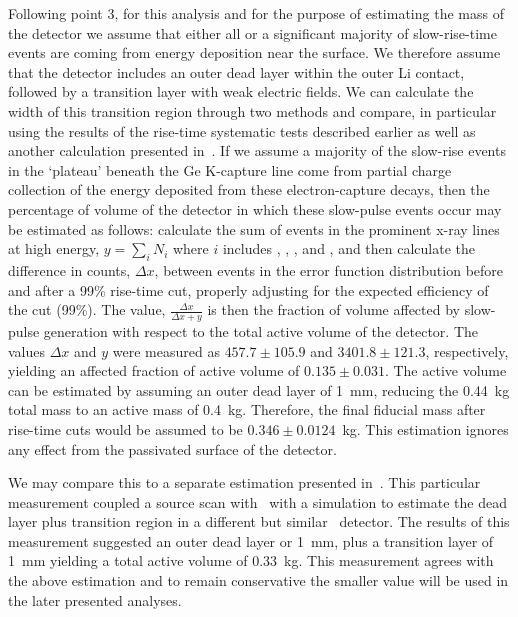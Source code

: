 	Following point 3, for this analysis and for the purpose of estimating the mass of the detector we assume that either all or a significant majority of slow-rise-time events are coming from energy deposition near the surface.  We therefore assume that the detector includes an outer dead layer within the outer Li contact, followed by a transition layer with weak electric fields.  We can calculate the width of this transition region through two methods and compare, in particular using the results of the rise-time systematic tests described earlier as well as another calculation presented in~\cite{Aalseth:2010aa}.  If we assume a majority of the slow-rise events in the `plateau' beneath the Ge K-capture line come from partial charge collection of the energy deposited from these electron-capture decays, then the percentage of volume of the detector in which these slow-pulse events occur may be estimated as follows:  calculate the sum of events in the prominent x-ray lines at high energy, $ y = \sum_{i} N_{i}$ where $i$ includes \gersixeight, \galsixeight, \znsixfive, and \asseventhree, and then calculate the difference in counts, $\Delta x$, between events in the error function distribution before and after a 99\% rise-time cut, properly adjusting for the expected efficiency of the cut (99\%).  The value, $\frac{\Delta x}{\Delta x + y}$ is then the fraction of volume affected by slow-pulse generation with respect to the total active volume of the detector.  The values $\Delta x$ and $y$ were measured as $457.7\pm105.9$ and $3401.8\pm121.3$, respectively, yielding an affected fraction of active volume of $0.135\pm0.031$.  The active volume can be estimated by assuming an outer dead layer of 1~mm, reducing the 0.44~kg total mass to an active mass of 0.4~kg.  Therefore, the final fiducial mass after rise-time cuts would be assumed to be $0.346\pm0.0124$~kg.  This estimation ignores any effect from the passivated surface of the detector.

	We may compare this to a separate estimation presented in~\cite{Aalseth:2010aa}.  This particular measurement coupled a source scan with \amtwofourone~with a simulation to estimate the dead layer plus transition region in a different but similar \ppc~detector.  The results of this measurement suggested an outer dead layer or 1~mm, plus a transition layer of 1~mm yielding a total active volume of 0.33~kg.  This measurement agrees with the above estimation and to remain conservative the smaller value will be used in the later presented analyses.
	
